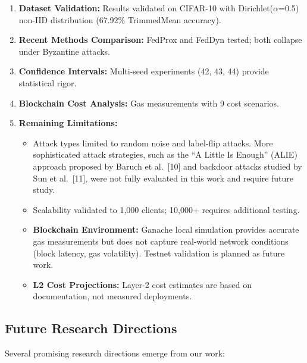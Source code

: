 \documentclass[12pt,a4paper,onecolumn]{article}
\begin{document}
\begin{enumerate}
    \item \textbf{Dataset Validation:} Results validated on CIFAR-10 with Dirichlet($\alpha$=0.5) non-IID distribution (67.92\% TrimmedMean accuracy).
    
    \item \textbf{Recent Methods Comparison:} FedProx and FedDyn tested; both collapse under Byzantine attacks.
    
    \item \textbf{Confidence Intervals:} Multi-seed experiments (42, 43, 44) provide statistical rigor.
    
    \item \textbf{Blockchain Cost Analysis:} Gas measurements with 9 cost scenarios.
    
    \item \textbf{Remaining Limitations:}
    \begin{itemize}
        \item Attack types limited to random noise and label-flip attacks. More sophisticated attack strategies, such as the ``A Little Is Enough'' (ALIE) approach proposed by Baruch et al.~[10] and backdoor attacks studied by Sun et al.~[11], were not fully evaluated in this work and require future study.
        \item Scalability validated to 1,000 clients; 10,000+ requires additional testing.
        \item \textbf{Blockchain Environment:} Ganache local simulation provides accurate gas measurements but does not capture real-world network conditions (block latency, gas volatility). Testnet validation is planned as future work.
        \item \textbf{L2 Cost Projections:} Layer-2 cost estimates are based on documentation, not measured deployments.
    \end{itemize}
\end{enumerate}

\subsection{Future Research Directions}

Several promising research directions emerge from our work:
\end{document}
